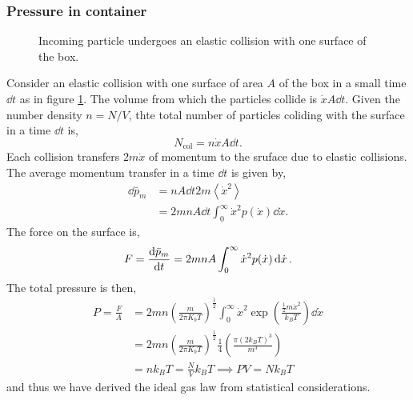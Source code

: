 \documentclass{book}
\begin{document}
\subsubsection{Pressure in container}
\begin{figure}
	\centering
	\usetikzlibrary{3d}
	\caption{Incoming particle undergoes an elastic collision with one surface of the box.}
	\label{fig:col}
\end{figure}
Consider an elastic collision with one surface of area $A$ of the box in a small time $\dd{t}$ as in figure \ref{fig:col}. The volume from which the particles collide is $\Dot{x}A\dd{t}$. Given the number density $n = N/V$, thte total number of particles coliding with the surface in a time $\dd{t}$ is,
\begin{equation}
	N_{\text{col}} = n\Dot{x}A \dd{t}.
\end{equation}
Each collision transfers $2m\Dot{x}$ of momentum to the sruface due to elastic collisions. The average momentum transfer in a time $\dd{t}$ is given by,
\begin{equation}
	\begin{split}
	\dd{\bar{p}_m} & = nA\dd{t}2m\left<\Dot{x}^2\right> \\
	& = 2mnA\dd{t} \int_0^{\infty} \Dot{x} ^2 p(\Dot{x})\dd{\Dot{x}}.
	\end{split}
\end{equation} 
The force on the surface is,
\begin{equation}
	F = \dv{\bar{p}_m}{t} = 2mnA \int_0^{\infty} \Dot{x} ^2 p(\Dot{x})\dd{\Dot{x}}.
\end{equation}
The total pressure is then,
\begin{equation}
	\begin{split}
		P = \frac{F}{A} & = 2mn\left(\frac{m}{2\pi K_bT}\right)^{\frac{1}{2}} \int_0^{\infty} \Dot{x}^2 \exp\left(\frac{\frac{1}{2}m\Dot{x}^2}{k_BT}\right) \dd{\Dot{x}} \\
		& = 2mn\left(\frac{m}{2\pi K_bT}\right)^{\frac{1}{2}} \frac{1}{4}\left(\frac{\pi(2k_BT)^3}{m^3}\right) \\
		& = nk_B T = \frac{N}{V}k_BT \implies \boxed{PV = Nk_B T}
	\end{split}
\end{equation}
and thus we have derived the ideal gas law from statistical considerations.
\end{document}
